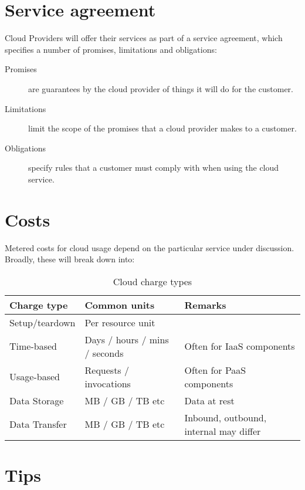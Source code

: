 \section{Service agreement}\label{service-agreement}

Cloud Providers will offer their services as part of a service
agreement, which specifies a number of promises, limitations and
obligations:

\begin{description}
\item[Promises]
are guarantees by the cloud provider of things it will do for the
customer.
\item[Limitations]
limit the scope of the promises that a cloud provider makes to a
customer.
\item[Obligations]
specify rules that a customer must comply with when using the cloud
service.
\end{description}

\section{Costs}
\label{sec:costs}

Metered costs for cloud usage depend on the particular service under
discussion. Broadly, these will break down into:

\begin{table}
  \begin{tabularx}{1.0\linewidth}{l l X}
    \toprule
    \textbf{Charge type} & \textbf{Common units} & \textbf{Remarks}\\
    \midrule
    Setup/teardown & Per resource unit & ~ \\
    Time-based & Days / hours / mins / seconds & Often for IaaS components\\
    Usage-based & Requests / invocations & Often for PaaS components\\
    Data Storage & MB / GB / TB etc & Data at rest\\
    Data Transfer & MB / GB / TB etc & Inbound, outbound, internal may differ\\
    \bottomrule
  \end{tabularx}
  \caption{Cloud charge types}
  \label{tab:cloud-charge-types}
\end{table}



\section{Tips}
\label{sec:tips}

